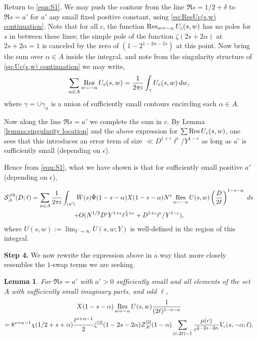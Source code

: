 \documentclass[12pt]{amsart}
\newtheorem{lemma}{Lemma}
\begin{document}
	Return to \eqref{eqn:S1}. We may push the contour from the line $\Re s = 1/2+\delta$ to $\Re s = a'$ for $a'$ any small fixed positive constant, using \eqref{eq:ResUc(s,w) continuation}. Note that for all $c$, the function $\operatornamewithlimits{Res}_{w = -\alpha} U_c(s,w)$ has no poles for $s$ in between these lines; the simple pole of the function $\zeta(2s+2\alpha)$ at $2s+2\alpha = 1$ is canceled by the zero of $(1-2^{1-2\alpha-2s})$ at this point. Now bring the sum over $\alpha \in A$ inside the integral, and note from the singularity structure of \eqref{eq:Uc(s,w) continuation} we may write,
	$$
	\sum_{\alpha \in A} \operatornamewithlimits{Res}_{w = -\alpha} U_c(s,w) = \frac{1}{2\pi i} \int_{\gamma} U_c(s,w)\, dw,
	$$
	where $\gamma = \cup \gamma_\alpha$ is a union of sufficiently small contours encircling each $\alpha \in A$.
	
	Now along the line $\Re s = a'$ we complete the sum in $c$. By Lemma \ref{lemma:singularity location} and the above expression for $\sum \operatornamewithlimits{Res} U_c(s,w)$, one sees that this introduces an error term of size $\ll D^{1+\epsilon} \ell^\epsilon /Y^{1-\epsilon}$ as long as $a'$ is sufficiently small (depending on $\epsilon$).
	
	Hence from \eqref{eqn:S1}, what we have shown is that for sufficiently small positive $a'$ (depending on $\epsilon$),
	
	\begin{multline}
		\label{eq:S_on_line_a}
		\mathcal S_A^{\ne 0}(D;\ell) = \sum_{\alpha\in A}  \frac 1{2\pi i} \int_{(a')}    \breve{W}(s)\breve{\Psi}(1-s-\alpha) X(1-s-\alpha)N^s  \operatornamewithlimits{Res}_{w=-\alpha} U(s,w)  \left( \frac{D}{2\ell}\right)^{1-s-\alpha}
		~ds \\ +O(N^{1/2}D^{\epsilon}Y^{1+\epsilon}\ell^{\frac 12+\epsilon} + D^{1+\epsilon} \ell^\epsilon /Y^{1-\epsilon}),
	\end{multline}
	where $U(s,w) := \lim_{Y\rightarrow\infty} U(s,w;Y)$ is well-defined in the region of this integral.
	
	\textbf{Step 4.} We now rewrite the expression above in a way that more closely resembles the $1$-swap terms we are seeking.
	
	\begin{lemma}
		\label{lem:func_eq}
		For $\Re s = a'$ with $a' > 0$ sufficiently small and all elements of the set $A$ with sufficiently small imaginary parts, and odd $\ell$,
		\begin{multline*}
			X(1-s-\alpha) \operatornamewithlimits{Res}_{w=-\alpha} U(s,w) \frac{1}{(2\ell)^{1-s-\alpha}} \\
			= 8^{s+\alpha-1} \chi(1/2+s+\alpha) \frac{\ell^{s+\alpha-1}}{2} \zeta^{[2]}(1-2s-2\alpha) Z_{A'}^{[2]}(1-\alpha) \sum_{(c,2\ell)=1} \frac{\mu(c)}{c^{2-2s-2\alpha}}V_c(s,-\alpha;\ell).
		\end{multline*}
	\end{lemma}
	
\end{document}
